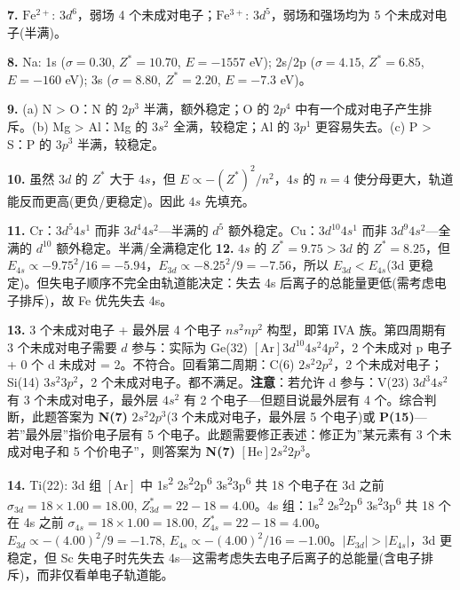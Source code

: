 \textbf{7.} \(\mathrm{Fe^{2+}}\): \(3d^6\)，弱场 4 个未成对电子；\(\mathrm{Fe^{3+}}\): \(3d^5\)，弱场和强场均为 5 个未成对电子(半满)。

\textbf{8.} Na: 1s (\(\sigma=0.30\), \(Z^*=10.70\), \(E=-1557\) eV); 2s/2p (\(\sigma=4.15\), \(Z^*=6.85\), \(E=-160\) eV); 3s (\(\sigma=8.80\), \(Z^*=2.20\), \(E=-7.3\) eV)。

\textbf{9.} (a) N \textgreater{} O：N 的 \(2p^3\) 半满，额外稳定；O 的 \(2p^4\) 中有一个成对电子产生排斥。(b) Mg \textgreater{} Al：Mg 的 \(3s^2\) 全满，较稳定；Al 的 \(3p^1\) 更容易失去。(c) P \textgreater{} S：P 的 \(3p^3\) 半满，较稳定。

\textbf{10.} 虽然 \(3d\) 的 \(Z^*\) 大于 \(4s\)，但 \(E \propto -(Z^*)^2/n^2\)，\(4s\) 的 \(n=4\) 使分母更大，轨道能反而更高(更负/更稳定)。因此 \(4s\) 先填充。

\textbf{11.} Cr：\(3d^5 4s^1\) 而非 \(3d^4 4s^2\)---半满的 \(d^5\) 额外稳定。Cu：\(3d^{10} 4s^1\) 而非 \(3d^9 4s^2\)---全满的 \(d^{10}\) 额外稳定。半满/全满稳定化
\textbf{12.} \(4s\) 的 \(Z^*=9.75 > 3d\) 的 \(Z^*=8.25\)，但 \(E_{4s} \propto -9.75^2/16 = -5.94\)，\(E_{3d} \propto -8.25^2/9 = -7.56\)，所以 \(E_{3d} < E_{4s}\)(3d 更稳定)。但失电子顺序不完全由轨道能决定：失去 4s 后离子的总能量更低(需考虑电子排斥)，故 Fe 优先失去 4s。

\textbf{13.} 3 个未成对电子 + 最外层 4 个电子 \箭 \(ns^2 np^2\) 构型，即第 IVA 族。第四周期有 3 个未成对电子需要 \(d\) 参与：实际为 Ge(32) \([\mathrm{Ar}]3d^{10}4s^2 4p^2\)，2 个未成对 p 电子 + 0 个 d 未成对 = 2。不符合。回看第二周期：C(6) \(2s^2 2p^2\)，2 个未成对电子；Si(14) \(3s^2 3p^2\)，2 个未成对电子。都不满足。\textbf{注意}：若允许 d 参与：V(23) \(3d^3 4s^2\) 有 3 个未成对电子，最外层 \(4s^2\) 有 2 个电子---但题目说最外层有 4 个。综合判断，此题答案为 \textbf{N(7)} \(2s^2 2p^3\)(3 个未成对电子，最外层 5 个电子)或 \textbf{P(15)}---若''最外层''指价电子层有 5 个电子。此题需要修正表述：修正为''某元素有 3 个未成对电子和 5 个价电子''，则答案为 \textbf{N(7)} \([\mathrm{He}]2s^2 2p^3\)。

\textbf{14.} Ti(22): 3d 组 \([\mathrm{Ar}]\) 中 1s\textsuperscript{2} 2s\textsuperscript{2}2p\textsuperscript{6} 3s\textsuperscript{2}3p\textsuperscript{6} 共 18 个电子在 3d 之前 \箭 \(\sigma_{3d} = 18 \times 1.00 = 18.00\), \(Z^*_{3d} = 22 - 18 = 4.00\)。4s 组：1s\textsuperscript{2} 2s\textsuperscript{2}2p\textsuperscript{6} 3s\textsuperscript{2}3p\textsuperscript{6} 共 18 个在 4s 之前 \箭 \(\sigma_{4s} = 18 \times 1.00 = 18.00\), \(Z^*_{4s} = 22 - 18 = 4.00\)。\(E_{3d} \propto -(4.00)^2/9 = -1.78\), \(E_{4s} \propto -(4.00)^2/16 = -1.00\)。\(|E_{3d}| > |E_{4s}|\)，3d 更稳定，但 Sc 失电子时先失去 4s---这需考虑失去电子后离子的总能量(含电子排斥)，而非仅看单电子轨道能。

